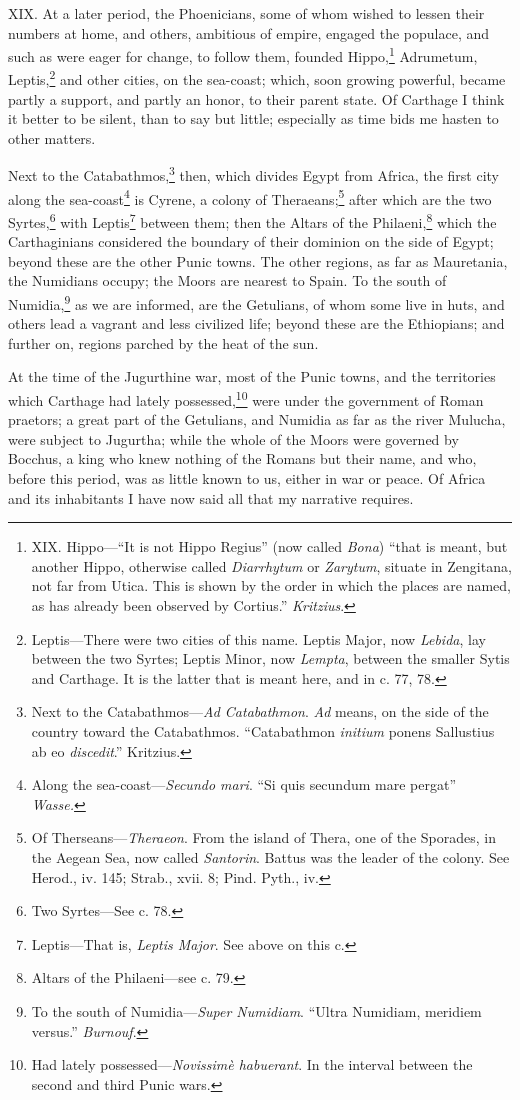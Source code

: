 XIX. At a later period, the Phoenicians, some of whom wished to lessen
their numbers at home, and others, ambitious of empire, engaged the
populace, and such as were eager for change, to follow them, founded
Hippo,\footnote{XIX. Hippo—``It is not Hippo Regius'' (now called \emph{Bona}) ``that is
meant, but another Hippo, otherwise called \emph{Diarrhytum} or \emph{Zarytum},
situate in Zengitana, not far from Utica. This is shown by the order
in which the places are named, as has already been observed by Cortius.''
\emph{Kritzius}.} Adrumetum, Leptis,\footnote{Leptis—There were two cities of this name. Leptis Major, now
\emph{Lebida}, lay between the two Syrtes; Leptis Minor, now \emph{Lempta},
between the smaller Sytis and Carthage. It is the latter that is meant
here, and in c. 77, 78.} and other cities, on the sea-coast;
which, soon growing powerful, became partly a support, and partly an
honor, to their parent state. Of Carthage I think it better to be
silent, than to say but little; especially as time bids me hasten to
other matters.

Next to the Catabathmos,\footnote{Next to the Catabathmos—\emph{Ad Catabathmon}. \emph{Ad} means, on the
side of the country toward the Catabathmos. ``Catabathmon \emph{initium}
ponens Sallustius ab eo \emph{discedit}.'' Kritzius.} then, which divides Egypt from Africa,
the first city along the sea-coast\footnote{Along the sea-coast—\emph{Secundo mari}. ``Si quis secundum mare
pergat'' \emph{Wasse.}} is Cyrene, a colony of
Theraeans;\footnote{Of Therseans—\emph{Theraeon}. From the island of Thera, one of the
Sporades, in the Aegean Sea, now called \emph{Santorin}. Battus was the
leader of the colony. See Herod., iv. 145; Strab., xvii. 8; Pind.
Pyth., iv.} after which are the two Syrtes,\footnote{Two Syrtes—See c. 78.} with Leptis\footnote{Leptis—That is, \emph{Leptis Major}. See above on this c.}
between them; then the Altars of the Philaeni,\footnote{Altars of the Philaeni—see c. 79.} which the
Carthaginians considered the boundary of their dominion on the side of
Egypt; beyond these are the other Punic towns. The other regions, as
far as Mauretania, the Numidians occupy; the Moors are nearest to
Spain. To the south of Numidia,\footnote{To the south of Numidia—\emph{Super Numidiam}. ``Ultra Numidiam,
meridiem versus.'' \emph{Burnouf}.} as we are informed, are the
Getulians, of whom some live in huts, and others lead a vagrant and
less civilized life; beyond these are the Ethiopians; and further on,
regions parched by the heat of the sun.

At the time of the Jugurthine war, most of the Punic towns, and the
territories which Carthage had lately possessed,\footnote{Had lately possessed—\emph{Novissimè habuerant}. In the interval
between the second and third Punic wars.} were under the
government of Roman praetors; a great part of the Getulians, and
Numidia as far as the river Mulucha, were subject to Jugurtha; while
the whole of the Moors were governed by Bocchus, a king who knew
nothing of the Romans but their name, and who, before this period,
was as little known to us, either in war or peace. Of Africa and its
inhabitants I have now said all that my narrative requires.

